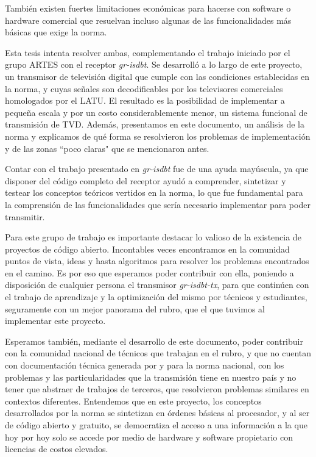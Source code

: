 También existen fuertes limitaciones económicas para hacerse con software o hardware comercial que resuelvan incluso algunas de las funcionalidades más básicas que exige la norma. 

Esta tesis intenta resolver ambas, complementando el trabajo iniciado por el grupo ARTES con el receptor \textit{gr-isdbt}. Se desarrolló a lo largo de este proyecto, un transmisor de televisión digital que cumple con las condiciones establecidas en la norma, y cuyas señales son decodificables por los televisores comerciales homologados por el LATU. El resultado es la posibilidad de implementar a pequeña escala y por un costo considerablemente menor, un sistema funcional de transmisión de TVD. Además, presentamos en este documento, un análisis de la norma y explicamos de qué forma se resolvieron los problemas de implementación y de las zonas ``poco claras" que se mencionaron antes.

Contar con el trabajo presentado en \textit{gr-isdbt} fue de una ayuda mayúscula, ya que disponer del código completo del receptor ayudó a comprender, sintetizar y testear los conceptos teóricos vertidos en la norma, lo que fue fundamental para la comprensión de las funcionalidades que sería necesario implementar para poder transmitir. 

Para este grupo de trabajo es importante destacar lo valioso de la existencia de proyectos de código abierto. Incontables veces encontramos en la comunidad puntos de vista, ideas y hasta algoritmos para resolver los problemas encontrados en el camino. Es por eso que esperamos poder contribuir con ella, poniendo a disposición de cualquier persona el transmisor \textit{gr-isdbt-tx}, para que continúen con el trabajo de aprendizaje y la optimización del mismo por técnicos y estudiantes, seguramente con un mejor panorama del rubro, que el que tuvimos al implementar este proyecto.

Esperamos también, mediante el desarrollo de este documento, poder contribuir con la comunidad nacional de técnicos que trabajan en el rubro, y que no cuentan con documentación técnica generada por y para la norma nacional, con los problemas y las particularidades que la transmisión tiene en nuestro país y no tener que abstraer de trabajos de terceros, que resolvieron problemas similares en contextos diferentes. Entendemos que en este proyecto, los conceptos desarrollados por la norma se sintetizan en órdenes básicas al procesador, y al ser de código abierto y gratuito, se democratiza el acceso a una información a la que hoy por hoy solo se accede por medio de hardware y software propietario con licencias de costos elevados.

